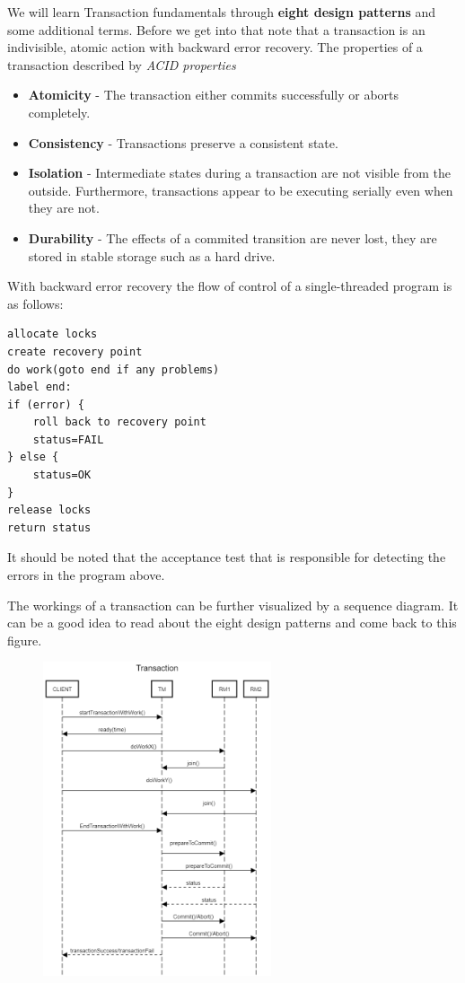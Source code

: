 We will learn Transaction fundamentals through \textbf{eight design patterns} and some additional terms. Before we get into that note that a transaction is an indivisible, atomic action with backward error recovery. The properties of a transaction described by \textit{ACID properties}
\begin{itemize}
\item \textbf{Atomicity} -  The transaction either commits successfully or aborts completely.
\item \textbf{Consistency} - Transactions preserve a consistent state.
\item \textbf{Isolation} - Intermediate states during a transaction are not visible from the outside. Furthermore, transactions appear to be executing serially even when they are not.
\item \textbf{Durability} - The effects of a commited transition are never lost, they are stored in stable storage such as a hard drive.
\end{itemize}

With backward error recovery the flow of control of a single-threaded program is as follows:
\begin{verbatim}
allocate locks
create recovery point
do work(goto end if any problems)
label end:
if (error) {
	roll back to recovery point
    status=FAIL
} else {
    status=OK
}
release locks
return status
\end{verbatim}
It should be noted that the acceptance test that is responsible for detecting the errors in the program above.

The workings of a transaction can be further visualized by a sequence diagram. It can be a good idea to read about the eight design patterns and come back to this figure. 
\begin{figure}[H]
\centering
\includegraphics[width=0.6\textwidth]{figures/Fault_Tolerance/TransactionSequence.png}
\end{figure}

